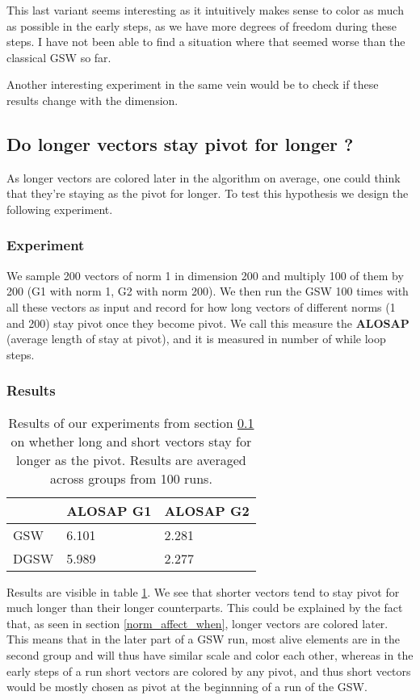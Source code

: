 \documentclass[12pt]{article}
\begin{document}
This last variant seems interesting as it intuitively makes sense to color as much as possible in the early steps, as we have more degrees of freedom during these steps. I have not been able to find a situation where that seemed worse than the classical GSW so far.

Another interesting experiment in the same vein would be to check if these results change with the dimension.


\subsection{Do longer vectors stay pivot for longer ?}\label{longer_vec_pivot_longer}
As longer vectors are colored later in the algorithm on average, one could think that they're staying as the pivot for longer. To test this hypothesis we design the following experiment.
\subsubsection{Experiment}
We sample 200 vectors of norm 1 in dimension 200 and multiply 100 of them by 200 (G1 with norm 1, G2 with norm 200). We then run the GSW 100 times with all these vectors as input and record for how long vectors of different norms (1 and 200) stay pivot once they become pivot. We call this measure the \textbf{ALOSAP} (average length of stay at pivot), and it is measured in number of while loop steps.
\subsubsection{Results}
\begin{table}[h!]
\centering
\caption{Results of our experiments  from section \ref{longer_vec_pivot_longer} on whether long and short vectors stay for longer as the pivot. Results are averaged across groups from 100 runs.}
\begin{tabular}{l|ll}
 &ALOSAP G1&ALOSAP G2\\
\hline
GSW&6.101&2.281\\
DGSW&5.989&2.277
\end{tabular}
\label{pivot_longer}
\end{table}

Results are visible in table \ref{pivot_longer}. We see that shorter vectors tend to stay pivot for much longer than their longer counterparts. This could be explained by the fact that, as seen in section \ref{norm_affect_when}, longer vectors are colored later. This means that in the later part of a GSW run, most alive elements are in the second group and will thus have similar scale and color each other, whereas in the early steps of a run short vectors are colored by any pivot, and thus short vectors would be mostly chosen as pivot at the beginnning of a run of the GSW. %
\end{document}
